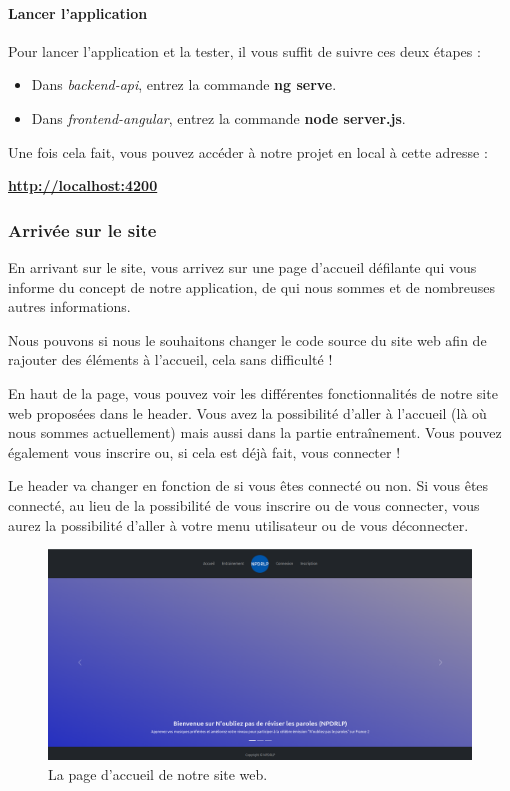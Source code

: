 \documentclass[12pt,french]{article}
\begin{document}
\paragraph{Lancer l'application}

Pour lancer l'application et la tester, il vous suffit de suivre ces deux étapes :

\begin{itemize}
	\item Dans \textit{backend-api}, entrez la commande \textbf{ng serve}.
	\item Dans \textit{frontend-angular}, entrez la commande \textbf{node server.js}.
\end{itemize}

Une fois cela fait, vous pouvez accéder à notre projet en local à cette adresse :

\textbf{\href{http://localhost:4200}{http://localhost:4200}}

\subsubsection{Arrivée sur le site}

En arrivant sur le site, vous arrivez sur une page d'accueil défilante qui vous informe du concept de notre application, de qui nous sommes et de nombreuses autres informations.

Nous pouvons si nous le souhaitons changer le code source du site web afin de rajouter des éléments à l'accueil, cela sans difficulté !

En haut de la page, vous pouvez voir les différentes fonctionnalités de notre site web proposées dans le header. Vous avez la possibilité d'aller à l'accueil (là où nous sommes actuellement) mais aussi dans la partie entraînement. Vous pouvez également vous inscrire ou, si cela est déjà fait, vous connecter !

Le header va changer en fonction de si vous êtes connecté ou non. Si vous êtes connecté, au lieu de la possibilité de vous inscrire ou de vous connecter, vous aurez la possibilité d'aller à votre menu utilisateur ou de vous déconnecter.

\begin{figure}[H]
	\centering
	\includegraphics[scale=0.25]{accueil.png}
	\caption{La page d'accueil de notre site web.}
\end{figure}
\end{document}
